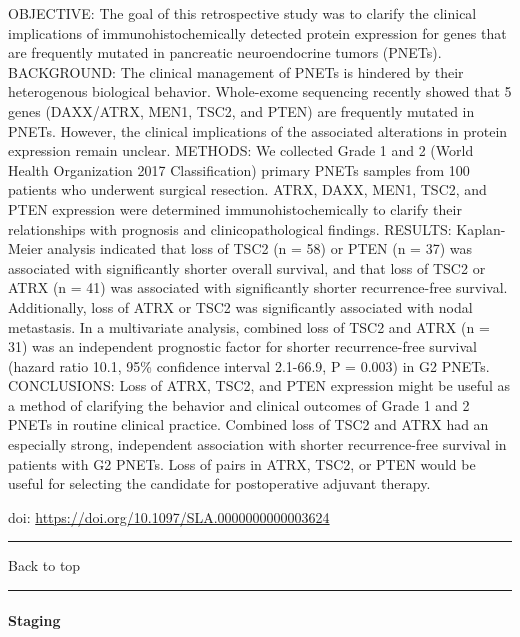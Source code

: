 \documentclass[
]{article}
\renewcommand{\linethickness}{0.05em}
\begin{document}
OBJECTIVE: The goal of this retrospective study was to clarify the
clinical implications of immunohistochemically detected protein
expression for genes that are frequently mutated in pancreatic
neuroendocrine tumors (PNETs). BACKGROUND: The clinical management of
PNETs is hindered by their heterogenous biological behavior. Whole-exome
sequencing recently showed that 5 genes (DAXX/ATRX, MEN1, TSC2, and
PTEN) are frequently mutated in PNETs. However, the clinical
implications of the associated alterations in protein expression remain
unclear. METHODS: We collected Grade 1 and 2 (World Health Organization
2017 Classification) primary PNETs samples from 100 patients who
underwent surgical resection. ATRX, DAXX, MEN1, TSC2, and PTEN
expression were determined immunohistochemically to clarify their
relationships with prognosis and clinicopathological findings. RESULTS:
Kaplan-Meier analysis indicated that loss of TSC2 (n = 58) or PTEN (n =
37) was associated with significantly shorter overall survival, and that
loss of TSC2 or ATRX (n = 41) was associated with significantly shorter
recurrence-free survival. Additionally, loss of ATRX or TSC2 was
significantly associated with nodal metastasis. In a multivariate
analysis, combined loss of TSC2 and ATRX (n = 31) was an independent
prognostic factor for shorter recurrence-free survival (hazard ratio
10.1, 95\% confidence interval 2.1-66.9, P = 0.003) in G2 PNETs.
CONCLUSIONS: Loss of ATRX, TSC2, and PTEN expression might be useful as
a method of clarifying the behavior and clinical outcomes of Grade 1 and
2 PNETs in routine clinical practice. Combined loss of TSC2 and ATRX had
an especially strong, independent association with shorter
recurrence-free survival in patients with G2 PNETs. Loss of pairs in
ATRX, TSC2, or PTEN would be useful for selecting the candidate for
postoperative adjuvant therapy.

doi: \url{https://doi.org/10.1097/SLA.0000000000003624}

\begin{center}\rule{0.5\linewidth}{\linethickness}\end{center}

Back to top

\begin{center}\rule{0.5\linewidth}{\linethickness}\end{center}

\pagebreak

\hypertarget{net_staging}{%
\paragraph{Staging}\label{net_staging}}
\end{document}
